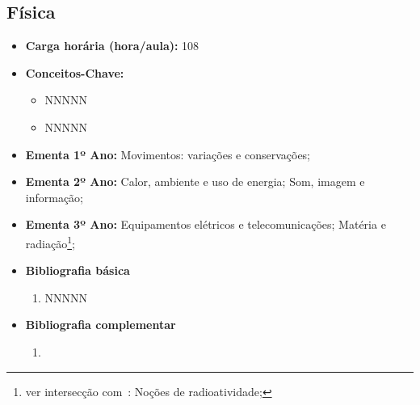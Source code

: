 \documentclass[11pt,fleqn]{book} %
\begin{document}
\newpage
\subsection{Física}\label{disc:fisica}
\begin{itemize}
	\item \textbf{Carga horária (hora/aula):} 108
	\item \textbf{Conceitos-Chave:}
	\begin{itemize}
		\item NNNNN
		\item NNNNN
	\end{itemize}
	\item \textbf{Ementa 1º Ano:} 
	Movimentos: variações e conservações;
	\item \textbf{Ementa 2º Ano:}	
	Calor, ambiente e uso de energia;
	Som, imagem e informação;
	\item \textbf{Ementa 3º Ano:}	
	Equipamentos elétricos e telecomunicações;
	Matéria e radiação\footnote{ver intersecção com~: Noções de radioatividade;};
	\item \textbf{Bibliografia básica}
	\begin{enumerate}
		\item NNNNN
	\end{enumerate}
	\item \textbf{Bibliografia complementar}
	\begin{enumerate}
		\item 
	\end{enumerate}	
\end{itemize}



\newpage
\end{document}
